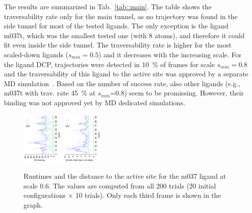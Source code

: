 \documentclass[usletter, 10pt, conference]{ieeeconf} %
\def\smin{s_{min}}
\begin{document}
{%
%

The results are summarized in Tab.~\ref{tab::main}.
The table shows the traversability rate only for the main tunnel, as no trajectory was found in the side tunnel for most of the tested ligands.
The only exception is the ligand m037t, which was the smallest tested one (with 8 atoms), and therefore it could fit even inside the side tunnel.
The traversability rate is higher for the most scaled-down ligands ($\smin=0.5$) and it decreases with the increasing scale.
For the ligand DCP, trajectories were detected in 10~\% of frames for scale $\smin=0.8$ and the traversability of this ligand
to the active site was approved by a separate MD simulation~\cite{marques2017catalytic}.
Based on the number of success rate, also other ligands (e.g., m037t with trav. rate 45~\% at $\smin$=0.8) seem to be promissing.
However, their binding was not approved yet by MD dedicated simulations.


{\def\a{270}
\begin{figure}[hb]
\centering
\includegraphics[width=0.18\textwidth,angle=\a]{fig/crop1}
\includegraphics[width=0.18\textwidth,angle=\a]{fig/crop2}
\caption{\label{fig::comparison}
    \small
    Runtimes and the distance to the active site for the m037 ligand at scale 0.6.
    The values are computed from all 200 trials (20 initial configurations $\times$ 10 trials).
    Only each third frame is shown in the graph.
}
\end{figure}
}

}
\end{document}
